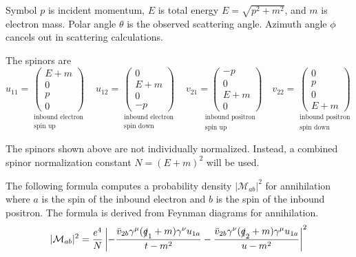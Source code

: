 \documentclass[12pt]{article}
\begin{document}
\noindent
Symbol $p$ is incident momentum,
$E$ is total energy $E=\sqrt{p^2+m^2}$,
and $m$ is electron mass.
Polar angle $\theta$ is the observed scattering angle.
Azimuth angle $\phi$ cancels out in scattering calculations.

\bigskip
\noindent
The spinors are
\begin{equation*}
u_{11}=
\underset{\substack{\text{inbound electron}\\\text{spin up}}}
{
\begin{pmatrix}E+m\\0\\p\\0\end{pmatrix}
}
\quad
u_{12}=
\underset{\substack{\text{inbound electron}\\\text{spin down}}}
{
\begin{pmatrix}0\\E+m\\0\\-p\end{pmatrix}
}
\quad
v_{21}
\underset{\substack{\text{inbound positron}\\\text{spin up}}}
{
=\begin{pmatrix}-p\\0\\E+m\\0\end{pmatrix}
}
\quad
v_{22}=
\underset{\substack{\text{inbound positron}\\\text{spin down}}}
{
\begin{pmatrix}0\\p\\0\\E+m\end{pmatrix}
}
\end{equation*}

\noindent
The spinors shown above are not individually normalized.
Instead, a combined spinor normalization constant $N=(E+m)^2$ will be used.

\bigskip
\noindent
The following formula computes a probability density $|\mathcal{M}_{ab}|^2$
for annihilation where $a$ is the spin of the inbound electron and
$b$ is the spin of the inbound positron.
The formula is derived from Feynman diagrams for annihilation.
\begin{equation*}
|\mathcal{M}_{ab}|^2
=
\frac{e^4}{N}
\left|
-\frac{\bar{v}_{2b}\gamma^\mu(\slashed{q}_1+m)\gamma^\nu u_{1a}}{t-m^2}
-\frac{\bar{v}_{2b}\gamma^\nu(\slashed{q}_2+m)\gamma^\mu u_{1a}}{u-m^2}
\right|^2
\end{equation*}
\end{document}
